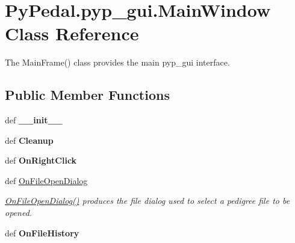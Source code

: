 \hypertarget{classPyPedal_1_1pyp__gui_1_1MainWindow}{
\section{PyPedal.pyp\_\-gui.MainWindow Class Reference}
\label{classPyPedal_1_1pyp__gui_1_1MainWindow}
}


The MainFrame() class provides the main pyp\_\-gui interface.  


\subsection*{Public Member Functions}
\begin{DoxyCompactItemize}
\item 
\hypertarget{classPyPedal_1_1pyp__gui_1_1MainWindow_ad8398bf01bd6660d4bbdebdb2cb5ed7c}{
def {\bfseries \_\-\_\-init\_\-\_\-}}
\label{classPyPedal_1_1pyp__gui_1_1MainWindow_ad8398bf01bd6660d4bbdebdb2cb5ed7c}

\item 
\hypertarget{classPyPedal_1_1pyp__gui_1_1MainWindow_a08371bed851f8d22027dd934d9172747}{
def {\bfseries Cleanup}}
\label{classPyPedal_1_1pyp__gui_1_1MainWindow_a08371bed851f8d22027dd934d9172747}

\item 
\hypertarget{classPyPedal_1_1pyp__gui_1_1MainWindow_ac83a9d469f275aa9bbbbb69fb46d448a}{
def {\bfseries OnRightClick}}
\label{classPyPedal_1_1pyp__gui_1_1MainWindow_ac83a9d469f275aa9bbbbb69fb46d448a}

\item 
def \hyperlink{classPyPedal_1_1pyp__gui_1_1MainWindow_a1eb6f25d8001093641719422d5b8c0fe}{OnFileOpenDialog}
\begin{DoxyCompactList}\small\item\em \hyperlink{classPyPedal_1_1pyp__gui_1_1MainWindow_a1eb6f25d8001093641719422d5b8c0fe}{OnFileOpenDialog()} produces the file dialog used to select a pedigree file to be opened. \item\end{DoxyCompactList}\item 
\hypertarget{classPyPedal_1_1pyp__gui_1_1MainWindow_a037366334082192348381b0ea8549b05}{
def {\bfseries OnFileHistory}}
\label{classPyPedal_1_1pyp__gui_1_1MainWindow_a037366334082192348381b0ea8549b05}


\end{DoxyCompactItemize}

